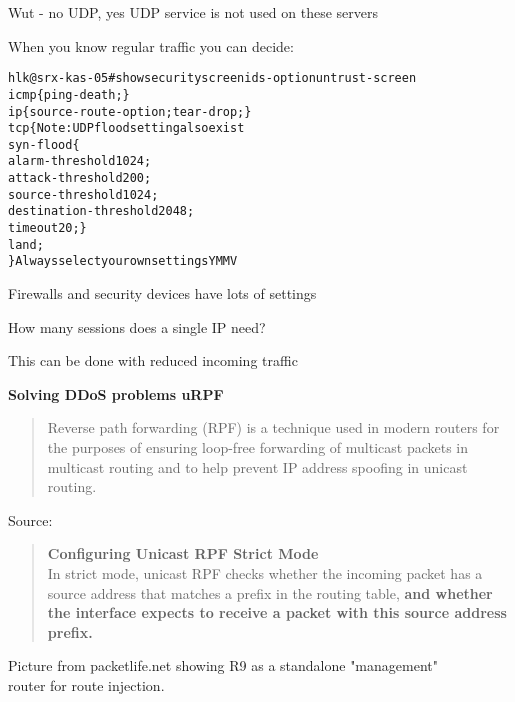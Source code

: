 \documentclass[20pt,landscape,a4paper,footrule]{foils}
\begin{document}
Wut - no UDP, yes UDP service is not used on these servers



When you know regular traffic you can decide:

\begin{alltt}\small
hlk@srx-kas-05# show security screen ids-option untrust-screen
icmp \{    ping-death; \}
ip \{    source-route-option;  tear-drop; \}
tcp \{    Note: UDP flood setting also exist
    syn-flood \{
        alarm-threshold 1024;
        attack-threshold 200;
        source-threshold 1024;
        destination-threshold 2048;
        timeout 20;    \}
    land;
\} Always select your own settings YMMV
\end{alltt}

\begin{list2}
\item Firewalls and security devices have lots of settings
\item How many sessions does a single IP need?
\item This can be done with reduced incoming traffic
\end{list2}


\centerline{\bf Solving DDoS problems uRPF}

\begin{quote}
Reverse path forwarding (RPF) is a technique used in modern routers for the purposes of ensuring loop-free forwarding of multicast packets in multicast routing and to help prevent IP address spoofing in unicast routing.
\end{quote}
Source: 



\begin{quote}
{\bf Configuring Unicast RPF Strict Mode}\\
In strict mode, unicast RPF checks whether the incoming packet has a source address that matches a prefix in the routing table, {\bf and whether the interface expects to receive a packet with this source address prefix.}
\end{quote}



Picture from packetlife.net showing  R9 as a standalone "management"\\ router for route injection.
\end{document}
